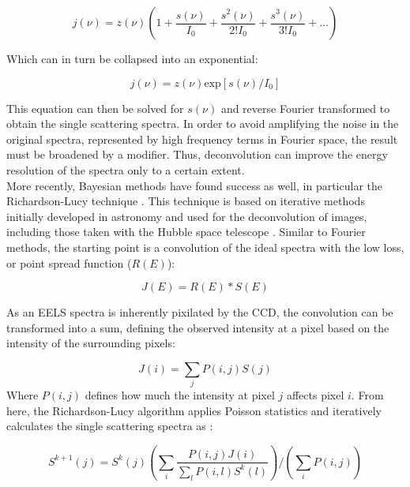 \begin{equation}
	j(\nu) = z(\nu) \left(1+\frac{s(\nu)}{I_0}+   \frac{s^2(\nu)}{2! I_0}+ \frac{s^3(\nu)}{3! I_0} + ...\right)
	\label{fourier_spectra}
\end{equation} 

Which can in turn be collapsed into an exponential:

\begin{equation}
	j(\nu) = z(\nu)\mathrm{exp}[s(\nu)/I_0]
\end{equation}

This equation can then be solved for $s(\nu)$ and reverse Fourier transformed to obtain the single scattering spectra.  In order to avoid amplifying the noise in the original spectra,  represented by high frequency terms in Fourier space, the result must be broadened by a modifier.  Thus, deconvolution can improve the energy resolution of the spectra only to a certain extent.  \\

More recently, Bayesian methods have found success as well, in particular the Richardson-Lucy technique \cite{richardson_lucy}. This technique is based on iterative methods initially developed in astronomy and used for the deconvolution of images, including those taken with the Hubble space telescope \cite{hubble}.  Similar to Fourier methods, the starting point is a convolution of the ideal spectra with the low loss, or point spread function ($R(E)$):

\begin{equation}
J(E) = R(E)\ast S(E)
\end{equation}

As an EELS spectra is inherently pixilated by the CCD, the convolution can be transformed into a sum, defining the observed intensity at a pixel based on the intensity of the surrounding pixels: 

\begin{equation}
	J(i) = \sum_{j} P(i,j) S(j)
\end{equation}
Where $P(i,j)$ defines how much the intensity at pixel $j$ affects pixel $i$.  
From here, the Richardson-Lucy algorithm applies Poisson statistics and iteratively calculates the single scattering spectra as  \cite{richardson_lucy}:  

\begin{equation}
S^{k+1}(j) = S^k(j) \left(\sum_{i} \frac{P(i,j)J(i)}{\sum_{l}P(i,l)S^k(l)}\right) \bigg/ \left( \sum_{i} P(i,j)\right)
\end{equation}

